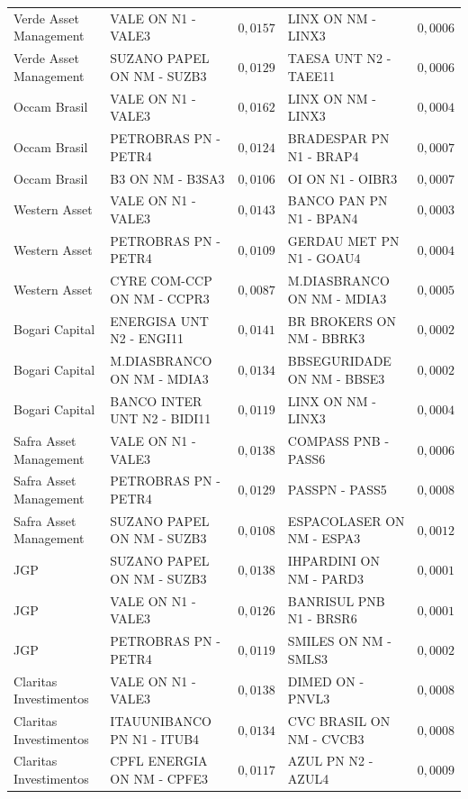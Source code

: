 \documentclass[11pt,a4paper]{article}
\begin{document}
\begin{center}
\begin{longtable}{@{}lp{3.9cm}rp{3.9cm}r@{}}
Verde Asset Management & VALE ON N1 - VALE3 & $0{,}0157$ & LINX ON NM - LINX3 & $0{,}0006$ \\
Verde Asset Management & SUZANO PAPEL ON NM - SUZB3 & $0{,}0129$ & TAESA UNT N2 - TAEE11 & $0{,}0006$ \\
Occam Brasil & VALE ON N1 - VALE3 & $0{,}0162$ & LINX ON NM - LINX3 & $0{,}0004$ \\
Occam Brasil & PETROBRAS PN - PETR4 & $0{,}0124$ & BRADESPAR PN N1 - BRAP4 & $0{,}0007$ \\
Occam Brasil & B3 ON NM - B3SA3 & $0{,}0106$ & OI ON N1 - OIBR3 & $0{,}0007$ \\
Western Asset & VALE ON N1 - VALE3 & $0{,}0143$ & BANCO PAN PN N1 - BPAN4 & $0{,}0003$ \\
Western Asset & PETROBRAS PN - PETR4 & $0{,}0109$ & GERDAU MET PN N1 - GOAU4 & $0{,}0004$ \\
Western Asset & CYRE COM-CCP ON NM - CCPR3 & $0{,}0087$ & M.DIASBRANCO ON NM - MDIA3 & $0{,}0005$ \\
Bogari Capital & ENERGISA UNT N2 - ENGI11 & $0{,}0141$ & BR BROKERS ON NM - BBRK3 & $0{,}0002$ \\
Bogari Capital & M.DIASBRANCO ON NM - MDIA3 & $0{,}0134$ & BBSEGURIDADE ON NM - BBSE3 & $0{,}0002$ \\
Bogari Capital & BANCO INTER UNT N2 - BIDI11 & $0{,}0119$ & LINX ON NM - LINX3 & $0{,}0004$ \\
Safra Asset Management & VALE ON N1 - VALE3 & $0{,}0138$ & COMPASS PNB - PASS6 & $0{,}0006$ \\
Safra Asset Management & PETROBRAS PN - PETR4 & $0{,}0129$ & PASSPN - PASS5 & $0{,}0008$ \\
Safra Asset Management & SUZANO PAPEL ON NM - SUZB3 & $0{,}0108$ & ESPACOLASER ON NM - ESPA3 & $0{,}0012$ \\
JGP & SUZANO PAPEL ON NM - SUZB3 & $0{,}0138$ & IHPARDINI ON NM - PARD3 & $0{,}0001$ \\
JGP & VALE ON N1 - VALE3 & $0{,}0126$ & BANRISUL PNB N1 - BRSR6 & $0{,}0001$ \\
JGP & PETROBRAS PN - PETR4 & $0{,}0119$ & SMILES ON NM - SMLS3 & $0{,}0002$ \\
Claritas Investimentos & VALE ON N1 - VALE3 & $0{,}0138$ & DIMED ON - PNVL3 & $0{,}0008$ \\
Claritas Investimentos & ITAUUNIBANCO PN N1 - ITUB4 & $0{,}0134$ & CVC BRASIL ON NM - CVCB3 & $0{,}0008$ \\
Claritas Investimentos & CPFL ENERGIA ON NM - CPFE3 & $0{,}0117$ & AZUL PN N2 - AZUL4 & $0{,}0009$ \\

\end{longtable}
\end{center}
\end{document}
